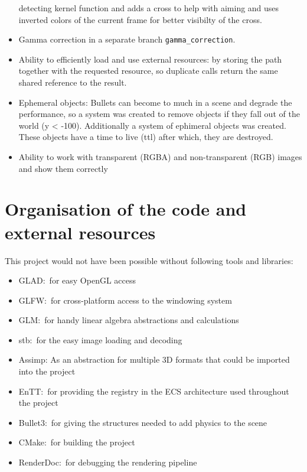 \documentclass[]{article}
\begin{document}
\begin{itemize}
            detecting kernel function and adds a cross to help with aiming and uses
            inverted colors of the current frame for better visibilty of the cross.
      \item Gamma correction in a separate branch \verb|gamma_correction|.
      \item Ability to efficiently load and use external resources: by storing the
            path together with the requested resource, so duplicate calls return
            the same shared reference to the result.
      \item Ephemeral objects: Bullets can become to much in a scene and degrade
            the performance, so a system was created to remove objects if they
            fall out of the world (y < -100). Additionally a system of ephimeral
            objects was created.  These objects have a time to live (ttl) after
            which, they are destroyed.
      \item Ability to work with transparent (RGBA) and non-transparent (RGB)
            images and show them correctly
\end{itemize}

\section{Organisation of the code and external resources}

This project would not have been possible without following tools and libraries:
\begin{itemize}
      \item GLAD:\ for easy OpenGL access
      \item GLFW:\ for cross-platform access to the windowing system
      \item GLM:\ for handy linear algebra abstractions and calculations
      \item stb:\ for the easy image loading and decoding
      \item Assimp: As an abstraction for multiple 3D formats that could be
            imported into the project
      \item EnTT:\ for providing the registry in the ECS architecture used
            throughout the project
      \item Bullet3:\ for giving the structures needed to add physics to the scene
      \item CMake:\ for building the project
      \item RenderDoc:\ for debugging the rendering pipeline
\end{itemize}
\end{document}
